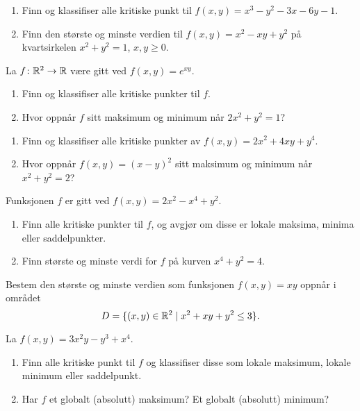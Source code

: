 
  
\oppgave[V2017, Oppgave 3]

\begin{enumerate}
  \item Finn og klassifiser alle kritiske punkt til $f(x, y) = x^3 - y^2 - 3x - 6y - 1$.
  \item Finn den største og minste verdien til $f(x, y) = x^2 - xy + y^2$ på
    kvartsirkelen $x^2 + y^2 = 1$, $x, y \geq 0$.
\end{enumerate}


\oppgave[K2016, Oppgave 4] La $f \colon \mathbb{R}^2 \to \mathbb{R}$ være gitt ved $f(x,y) =
e^{xy}$.

\begin{enumerate}
  \item Finn og klassifiser alle kritiske punkter til $f$.
  \item Hvor oppnår $f$ sitt maksimum og minimum når $2x^2 + y^2 = 1$?
\end{enumerate}


\oppgave[V2016, Oppgave 3]

\begin{enumerate}
  \item Finn og klassifiser alle kritiske punkter av $f(x, y) = 2x^2 + 4xy +
    y^4$.
  \item Hvor oppnår $f(x,y) = (x - y)^2$ sitt maksimum og minimum når $x^2 + y^2
    = 2$?
\end{enumerate}


\oppgave[K2015, Oppgave 4] Funksjonen $f$ er gitt ved $f(x, y) = 2x^2 - x^4 + y^2$.

\begin{enumerate}
  \item Finn alle kritiske punkter til $f$, og avgjør om disse er lokale
    maksima, minima eller saddelpunkter.
  \item Finn største og minste verdi for $f$ på kurven $x^4 + y^2 = 4$. 
\end{enumerate}


\oppgave[V2015, Oppgave 3] Bestem den største og minste verdien som funksjonen
$f(x,y) = xy$ oppnår i området
%
\begin{equation*}
  D = \{ (x,y) \in \mathbb{R}^2 \mid x^2 + xy + y^2 \leq 3 \}.
\end{equation*}


\oppgave[K2014, Oppgave 6] La $f(x,y) = 3x^2 y - y^3 + x^4$.

\begin{enumerate}
  \item Finn alle kritiske punkt til $f$ og klassifiser disse som lokale
    maksimum, lokale minimum eller saddelpunkt.
  \item Har $f$ et globalt (absolutt) maksimum? Et globalt (absolutt) minimum?
\end{enumerate}



